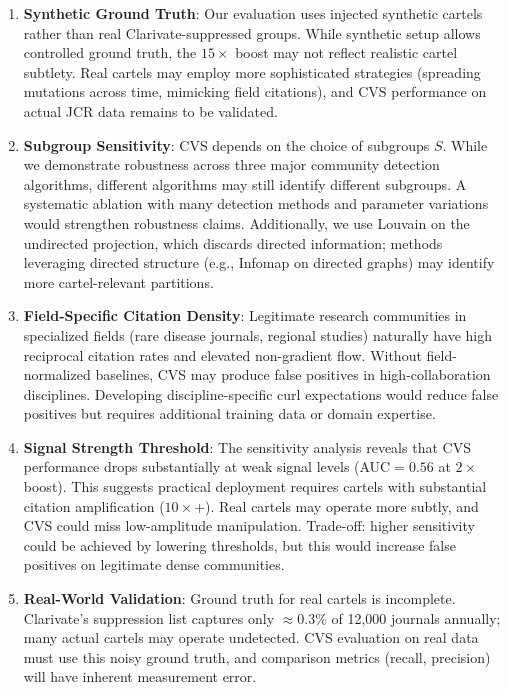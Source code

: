 \documentclass[11pt,letterpaper]{article}
\begin{document}
\begin{enumerate}
  \item \textbf{Synthetic Ground Truth}: Our evaluation uses injected synthetic cartels rather than real Clarivate-suppressed groups. While synthetic setup allows controlled ground truth, the $15\times$ boost may not reflect realistic cartel subtlety. Real cartels may employ more sophisticated strategies (spreading mutations across time, mimicking field citations), and CVS performance on actual JCR data remains to be validated.

  \item \textbf{Subgroup Sensitivity}: CVS depends on the choice of subgroups $S$. While we demonstrate robustness across three major community detection algorithms, different algorithms may still identify different subgroups. A systematic ablation with many detection methods and parameter variations would strengthen robustness claims. Additionally, we use Louvain on the undirected projection, which discards directed information; methods leveraging directed structure (e.g., Infomap on directed graphs) may identify more cartel-relevant partitions.

  \item \textbf{Field-Specific Citation Density}: Legitimate research communities in specialized fields (rare disease journals, regional studies) naturally have high reciprocal citation rates and elevated non-gradient flow. Without field-normalized baselines, CVS may produce false positives in high-collaboration disciplines. Developing discipline-specific curl expectations would reduce false positives but requires additional training data or domain expertise.

  \item \textbf{Signal Strength Threshold}: The sensitivity analysis reveals that CVS performance drops substantially at weak signal levels (AUC$=0.56$ at $2\times$ boost). This suggests practical deployment requires cartels with substantial citation amplification ($10\times$+). Real cartels may operate more subtly, and CVS could miss low-amplitude manipulation. Trade-off: higher sensitivity could be achieved by lowering thresholds, but this would increase false positives on legitimate dense communities.

  \item \textbf{Real-World Validation}: Ground truth for real cartels is incomplete. Clarivate's suppression list captures only $\approx 0.3\%$ of 12,000 journals annually; many actual cartels may operate undetected. CVS evaluation on real data must use this noisy ground truth, and comparison metrics (recall, precision) will have inherent measurement error.
\end{enumerate}
\end{document}
